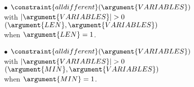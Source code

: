 \begin{ctrdesc}
 \begin{minipage}[t]{11.2cm}
$\bullet$ $\constraint{alldifferent}(\argument{VARIABLES})$\\
 \hspace*{10pt} with\hspace*{3pt} $|\argument{VARIABLES}|>0$\\
\hspace*{7pt}{\bf implies}\hspace*{1pt} $ $\hyperlink{Clength_last_sequence}{}$(\argument{LEN},\argument{VARIABLES})$\\
 \hspace*{10pt} when\hspace*{3pt} $\argument{LEN}=1$.
\end{minipage}
\vspace{0.16cm}

 \begin{minipage}[t]{11.2cm}
$\bullet$ $\constraint{alldifferent}(\argument{VARIABLES})$\\
 \hspace*{10pt} with\hspace*{3pt} $|\argument{VARIABLES}|>0$\\
\hspace*{7pt}{\bf implies}\hspace*{1pt} $ $\hyperlink{Cmin_nvalue}{}$(\argument{MIN},\argument{VARIABLES})$\\
 \hspace*{10pt} when\hspace*{3pt} $\argument{MIN}=1$.
\end{minipage}
\vspace{0.16cm}


\end{ctrdesc}

